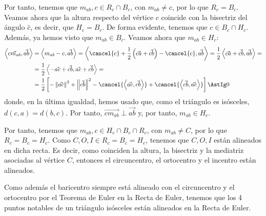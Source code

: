 \begin{ejercicio}
    Por tanto, tenemos que $m_{ab},c \in R_c \cap B_c$, con $m_{ab}\neq c$, por lo que $R_c = B_c$. Veamos ahora que la altura respecto del vértice $c$ coincide con la bisectriz del ángulo $\widehat{c}$,
    es decir, que $H_c = B_c$. De forma evidente, tenemos que $c\in B_c\cap H_c$. Además, ya hemos visto que $m_{ab}\in B_c$. Veamos ahora que $m_{ab}\in H_c$:
    \begin{align*}
        \left\langle \vec{cm_{ab}}, \vec{ab}\right\rangle &=
        \left\langle m_{ab}-c, \vec{ab}\right\rangle = \left\langle \cancel{c}+\frac{1}{2}\left(\vec{ca} + \vec{cb}\right) - \cancel{c}, \vec{ab}\right\rangle
        = \frac{1}{2}\left\langle \vec{ca} + \vec{cb}, \vec{ab}\right\rangle =\\
        &= \frac{1}{2}\left\langle -\vec{ac} + \vec{cb}, \vec{ac} + \vec{cb}\right\rangle =\\
        &= \frac{1}{2}\left[-\left\|\vec{ac}\right\|^2 + \left\|\vec{cb}\right\|^2 - \cancel{\left\langle \vec{ac}, \vec{cb}\right\rangle} + \cancel{\left\langle \vec{cb}, \vec{ac}\right\rangle}\right]
        \AstIg 0
    \end{align*}
    donde, en la última igualdad, hemos usado que, como el triángulo es isósceles, $d(c,a)=d(b,c)$. Por tanto, $\vec{cm_{ab}}\perp \vec{ab}$ y, por tanto, $m_{ab}\in H_c$.

    Por tanto, tenemos que $m_{ab},c \in H_c \cap B_c \cap R_c$, con $m_{ab}\neq C$, por lo que $R_c = B_c = H_c$. Como $C,O,I\in R_c=B_c=H_c$, tenemos que $C,O,I$ están alineados en dicha recta.
    Es decir, como coinciden la altura, la bisectriz y la mediatriz asociadas al vértice $C$, entonces el circuncentro, el ortocentro y el incentro están alineados.

    Como además el baricentro siempre está alineado con el circuncentro y el ortocentro por el Teorema de Euler en la Recta de Euler, tenemos que los 4 puntos notables de un triángulo isósceles están alineados en la Recta de Euler.
\end{ejercicio}



